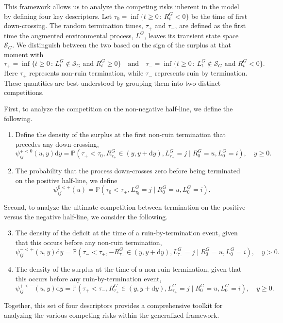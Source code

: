 \documentclass[11pt]{article}
\numberwithin{table}{section}
\numberwithin{figure}{section}
\numberwithin{equation}{section}
\newcommand{\dd}{\mathrm{d}}
\newcommand{\1}{{\mathbf 1}}
\newcommand{\0}{\mat{0}}
\begin{document}
This framework allows us to analyze the competing risks inherent in the model by defining four key descriptors. Let \(\tau_0 = \inf\{t \ge 0 \,:\,R^G_t < 0\}\) be the time of first down-crossing. The random termination times, \(\tau_+\) and \(\tau_-\), are defined as the first time the augmented environmental process, \(L^G\), leaves its transient state space \(\mathcal{S}_G\). We distinguish between the two based on the sign of the surplus at that moment with
\[
\tau_+ = \inf\{t \ge 0 \,:\, L^G_t \notin \mathcal{S}_G \text{ and } R^G_t \ge 0\} \quad \text{and} \quad \tau_- = \inf\{t \ge 0 \,:\, L^G_t \notin \mathcal{S}_G \text{ and } R^G_t < 0\}.
\]
Here \(\tau_+\) represents non-ruin termination, while \(\tau_-\) represents ruin by termination. These quantities are best understood by grouping them into two distinct competitions.

First, to analyze the competition on the non-negative half-line, we define the following.
\begin{enumerate}
    \item Define the density of the surplus at the first non-ruin termination that precedes any down-crossing,
    \[
    \psi_{ij}^{+<0}(u, y) \dd y = \mathbb{P}(\tau_+ < \tau_0, R^G_{\tau_+} \in (y, y+\dd y), L^G_{\tau_+} = j \mid R^G_0=u, L^G_0=i), \quad y \ge 0.
    \]
    \item The probability that the process down-crosses zero before being terminated on the positive half-line, we define
    \[
    \psi_{ij}^{0<+}(u) = \mathbb{P}(\tau_0 < \tau_+, L^G_{\tau_0} = j \mid R^G_0=u, L^G_0=i).
    \]
\end{enumerate}
Second, to analyze the ultimate competition between termination on the positive versus the negative half-line, we consider the following.
\begin{enumerate}
\setcounter{enumi}{2}
    \item The density of the deficit at the time of a ruin-by-termination event, given that this occurs before any non-ruin termination,
    \[
    \psi_{ij}^{-<+}(u, y) \dd y = \mathbb{P}(\tau_- < \tau_+, -R^G_{\tau_-} \in (y, y+\dd y), L^G_{\tau_-} = j \mid R^G_0=u, L^G_0=i), \quad y > 0.
    \]
    \item The density of the surplus at the time of a non-ruin termination, given that this occurs before any ruin-by-termination event,
    \[
    \psi_{ij}^{+<-}(u, y) \dd y = \mathbb{P}(\tau_+ < \tau_-, R^G_{\tau_+} \in (y, y+\dd y), L^G_{\tau_+} = j \mid R^G_0=u, L^G_0=i), \quad y \ge 0.
    \]
\end{enumerate}
Together, this set of four descriptors provides a comprehensive toolkit for analyzing the various competing risks within the generalized framework.
\end{document}
